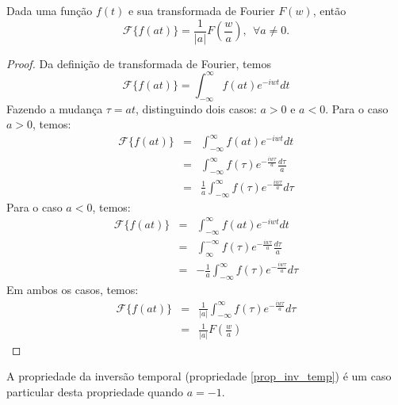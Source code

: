 \begin{teo}\label{prop_mud_esc} Dada uma função $f(t)$ e sua transformada de Fourier $F(w)$, então 
\begin{equation}
\mathcal{F}\{f(at)\}=\frac{1}{|a|}F\left(\frac{w}{a}\right),~~ \forall a\neq 0.
\end{equation}
\end{teo}
\begin{proof} Da definição de transformada de Fourier, temos
\begin{equation}
\mathcal{F}\{f(at)\}=\int_{-\infty}^{\infty} f(at)e^{-iwt}dt
\end{equation}
Fazendo a mudança $\tau= at$, distinguindo dois casos: $a>0$ e $a<0$.
Para o caso $a>0$, temos:
\begin{eqnarray*}
\mathcal{F}\{f(at)\}&=&\int_{-\infty}^{\infty} f(at)e^{-iwt}dt\\
&=&\int_{-\infty}^{\infty} f(\tau)e^{-\frac{iw\tau}{a}}\frac{d\tau}{a}\\
&=&\frac{1}{a}\int_{-\infty}^{\infty} f(\tau)e^{-\frac{iw\tau}{a}}d\tau
\end{eqnarray*}
Para o caso $a<0$, temos:
\begin{eqnarray*}
\mathcal{F}\{f(at)\}&=&\int_{-\infty}^{\infty} f(at)e^{-iwt}dt\\
&=&\int_{\infty}^{-\infty} f(\tau)e^{-\frac{iw\tau}{a}}\frac{d\tau}{a}\\
&=&-\frac{1}{a}\int_{-\infty}^{\infty} f(\tau)e^{-\frac{iw\tau}{a}}d\tau
\end{eqnarray*}
Em ambos os casos, temos:
\begin{eqnarray*}
\mathcal{F}\{f(at)\}&=&\frac{1}{|a|}\int_{-\infty}^{\infty} f(\tau)e^{-\frac{iw\tau}{a}}d\tau\\
&=&\frac{1}{|a|}F\left(\frac{w}{a}\right)
\end{eqnarray*}
\end{proof}
\begin{obs} A propriedade da inversão temporal (propriedade \ref{prop_inv_temp}) é um caso particular desta propriedade quando $a=-1$.
\end{obs}
